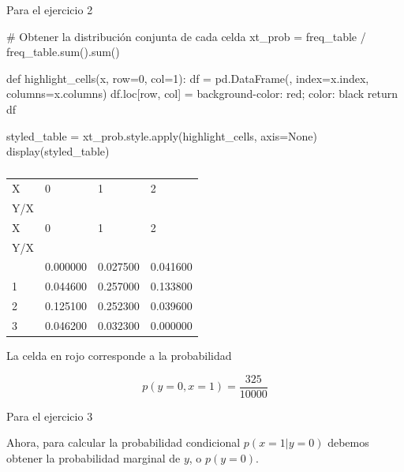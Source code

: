 \documentclass[
  letterpaper,
  DIV=11,
  numbers=noendperiod]{scrartcl}
\newenvironment{Shaded}{\begin{snugshade}}{\end{snugshade}}
\newcommand{\BuiltInTok}[1]{\textcolor[rgb]{0.00,0.23,0.31}{#1}}
\newcommand{\CommentTok}[1]{\textcolor[rgb]{0.37,0.37,0.37}{#1}}
\newcommand{\ControlFlowTok}[1]{\textcolor[rgb]{0.00,0.23,0.31}{#1}}
\newcommand{\DecValTok}[1]{\textcolor[rgb]{0.68,0.00,0.00}{#1}}
\newcommand{\KeywordTok}[1]{\textcolor[rgb]{0.00,0.23,0.31}{#1}}
\newcommand{\NormalTok}[1]{\textcolor[rgb]{0.00,0.23,0.31}{#1}}
\newcommand{\OperatorTok}[1]{\textcolor[rgb]{0.37,0.37,0.37}{#1}}
\newcommand{\StringTok}[1]{\textcolor[rgb]{0.13,0.47,0.30}{#1}}
\newcommand{\VariableTok}[1]{\textcolor[rgb]{0.07,0.07,0.07}{#1}}
\begin{document}
Para el ejercicio 2

\begin{Shaded}
\begin{Highlighting}[]
\CommentTok{\# Obtener la distribución conjunta de cada celda}
\NormalTok{xt\_prob }\OperatorTok{=}\NormalTok{ freq\_table }\OperatorTok{/}\NormalTok{ freq\_table.}\BuiltInTok{sum}\NormalTok{().}\BuiltInTok{sum}\NormalTok{()}

\KeywordTok{def}\NormalTok{ highlight\_cells(x, row}\OperatorTok{=}\DecValTok{0}\NormalTok{, col}\OperatorTok{=}\DecValTok{1}\NormalTok{):}
\NormalTok{    df }\OperatorTok{=}\NormalTok{ pd.DataFrame(}\StringTok{\textquotesingle{}\textquotesingle{}}\NormalTok{, index}\OperatorTok{=}\NormalTok{x.index, columns}\OperatorTok{=}\NormalTok{x.columns)}
\NormalTok{    df.loc[row, col] }\OperatorTok{=} \StringTok{\textquotesingle{}background{-}color: red; color: black\textquotesingle{}}
    \ControlFlowTok{return}\NormalTok{ df}

\NormalTok{styled\_table }\OperatorTok{=}\NormalTok{ xt\_prob.style.}\BuiltInTok{apply}\NormalTok{(highlight\_cells, axis}\OperatorTok{=}\VariableTok{None}\NormalTok{)}
\NormalTok{display(styled\_table)}
\end{Highlighting}
\end{Shaded}

\begin{longtable}[]{@{}llll@{}}
\caption{}\label{T_bd618}\tabularnewline
\toprule\noalign{}
X & 0 & 1 & 2 \\
Y/X & ~ & ~ & ~ \\
\midrule\noalign{}
\endfirsthead
\toprule\noalign{}
X & 0 & 1 & 2 \\
Y/X & ~ & ~ & ~ \\
\midrule\noalign{}
\endhead
\bottomrule\noalign{}
\endlastfoot
0 & 0.000000 & 0.027500 & 0.041600 \\
1 & 0.044600 & 0.257000 & 0.133800 \\
2 & 0.125100 & 0.252300 & 0.039600 \\
3 & 0.046200 & 0.032300 & 0.000000 \\
\end{longtable}

La celda en rojo corresponde a la probabilidad

\[
  p(y=0, x=1) = \frac{325}{10000}
\]

Para el ejercicio 3

Ahora, para calcular la probabilidad condicional \(p(x=1|y=0)\) debemos
obtener la probabilidad marginal de \(y\), o \(p(y=0)\).
\end{document}

